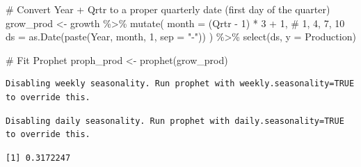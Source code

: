 \documentclass[
  letterpaper,
  DIV=11,
  numbers=noendperiod]{scrartcl}
\newenvironment{Shaded}{\begin{snugshade}}{\end{snugshade}}
\newcommand{\AttributeTok}[1]{\textcolor[rgb]{0.40,0.45,0.13}{#1}}
\newcommand{\CommentTok}[1]{\textcolor[rgb]{0.37,0.37,0.37}{#1}}
\newcommand{\DecValTok}[1]{\textcolor[rgb]{0.68,0.00,0.00}{#1}}
\newcommand{\FunctionTok}[1]{\textcolor[rgb]{0.28,0.35,0.67}{#1}}
\newcommand{\NormalTok}[1]{\textcolor[rgb]{0.00,0.23,0.31}{#1}}
\newcommand{\OtherTok}[1]{\textcolor[rgb]{0.00,0.23,0.31}{#1}}
\newcommand{\SpecialCharTok}[1]{\textcolor[rgb]{0.37,0.37,0.37}{#1}}
\newcommand{\StringTok}[1]{\textcolor[rgb]{0.13,0.47,0.30}{#1}}
\begin{document}
\begin{Shaded}
\begin{Highlighting}[]
\CommentTok{\# Convert Year + Qrtr to a proper quarterly date (first day of the quarter)}
\NormalTok{grow\_prod }\OtherTok{\textless{}{-}}\NormalTok{ growth }\SpecialCharTok{\%\textgreater{}\%}
  \FunctionTok{mutate}\NormalTok{(}
    \AttributeTok{month =}\NormalTok{ (Qrtr }\SpecialCharTok{{-}} \DecValTok{1}\NormalTok{) }\SpecialCharTok{*} \DecValTok{3} \SpecialCharTok{+} \DecValTok{1}\NormalTok{,                     }\CommentTok{\# 1, 4, 7, 10}
    \AttributeTok{ds =} \FunctionTok{as.Date}\NormalTok{(}\FunctionTok{paste}\NormalTok{(Year, month, }\DecValTok{1}\NormalTok{, }\AttributeTok{sep =} \StringTok{"{-}"}\NormalTok{))}
\NormalTok{  ) }\SpecialCharTok{\%\textgreater{}\%}
  \FunctionTok{select}\NormalTok{(ds, }\AttributeTok{y =}\NormalTok{ Production)}

\CommentTok{\# Fit Prophet}
\NormalTok{proph\_prod }\OtherTok{\textless{}{-}} \FunctionTok{prophet}\NormalTok{(grow\_prod)}
\end{Highlighting}
\end{Shaded}

\begin{verbatim}
Disabling weekly seasonality. Run prophet with weekly.seasonality=TRUE to override this.
\end{verbatim}

\begin{verbatim}
Disabling daily seasonality. Run prophet with daily.seasonality=TRUE to override this.
\end{verbatim}

\begin{Shaded}
\end{Shaded}

\begin{verbatim}
[1] 0.3172247
\end{verbatim}
\end{document}
